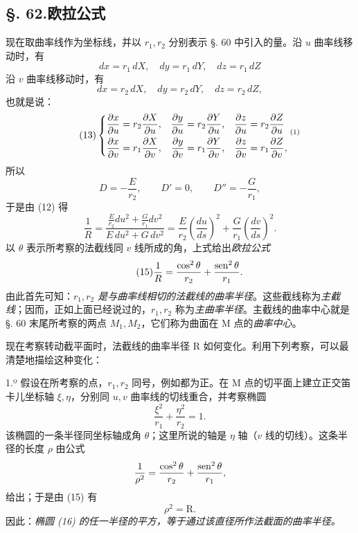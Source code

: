 \subsection*{\S. 62.\quad 欧拉公式}

现在取曲率线作为坐标线，并以 \(r_1,r_2\) 分别表示 \S. 60 中引入的量。沿 \(u\) 曲率线移动时，有
\[
 dx=r_1\,dX,\quad dy=r_1\,dY,\quad dz=r_1\,dZ
\]
沿 \(v\) 曲率线移动时，有
\[
 dx=r_2\,dX,\quad dy=r_2\,dY,\quad dz=r_2\,dZ,
\]
也就是说：
\begin{equation}\tag{13}
\left\{
\begin{aligned}
 \frac{\partial x}{\partial u}&=r_2\frac{\partial X}{\partial u},&
 \frac{\partial y}{\partial u}&=r_2\frac{\partial Y}{\partial u},&
 \frac{\partial z}{\partial u}&=r_2\frac{\partial Z}{\partial u}\\
 \frac{\partial x}{\partial v}&=r_1\frac{\partial X}{\partial v},&
 \frac{\partial y}{\partial v}&=r_1\frac{\partial Y}{\partial v},&
 \frac{\partial z}{\partial v}&=r_1\frac{\partial Z}{\partial v},
\end{aligned}
\right.\srcfnmark{1}
\end{equation}
所以
\begin{equation}\tag{14}
 D=-\frac{E}{r_2},\qquad D'=0,\qquad D''=-\frac{G}{r_1},
\end{equation}
于是由 (12) 得
\[
 \frac{1}{R}
 =
 \frac{\frac{E}{r_2}du^2+\frac{G}{r_1}dv^2}{E\,du^2+G\,dv^2}
 =
 \frac{E}{r_2}\left(\frac{du}{ds}\right)^2
 +\frac{G}{r_1}\left(\frac{dv}{ds}\right)^2.
\]
以 \(\theta\) 表示所考察的法截线同 \(v\) 线所成的角，上式给出\emph{欧拉公式}
\begin{equation}\tag{15}
 \frac{1}{R}=\frac{\cos^2\theta}{r_2}+\frac{\operatorname{sen}^2\theta}{r_1}.
\end{equation}
由此首先可知：\emph{\(r_1,r_2\) 是与曲率线相切的法截线的曲率半径}。这些截线称为\emph{主截线}；因而，正如上面已经说过的，\(r_1,r_2\) 称为\emph{主曲率半径}。主截线的曲率中心就是 \S. 60 末尾所考察的两点 \(M_1,M_2\)，它们称为曲面在 M 点的\emph{曲率中心}。

现在考察转动截平面时，法截线的曲率半径 R 如何变化。利用下列考察，可以最清楚地描绘这种变化：

1.º 假设在所考察的点，\(r_1,r_2\) 同号，例如都为正。在 M 点的切平面上建立正交笛卡儿坐标轴 \(\xi,\eta\)，分别同 \(u,v\) 曲率线的切线重合，并考察椭圆
\begin{equation}\tag{16}
\frac{\xi^2}{r_1}+\frac{\eta^2}{r_2}=1.
\end{equation}
该椭圆的一条半径同坐标轴成角 \(\theta\)；这里所说的轴是 \(\eta\) 轴（\(v\) 线的切线）。这条半径的长度 \(\rho\) 由公式
\[
\frac{1}{\rho^2}=\frac{\cos^2\theta}{r_2}+\frac{\operatorname{sen}^2\theta}{r_1},
\]
给出；于是由 (15) 有
\[
\rho^2=\mathrm{R}.
\]
因此：\emph{椭圆 (16) 的任一半径的平方，等于通过该直径所作法截面的曲率半径。}

